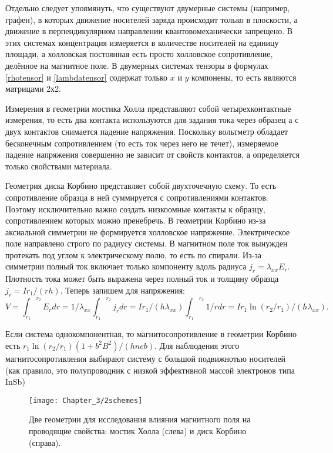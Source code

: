 Отдельно следует упоямянуть, что существуют двумерные системы (например, графен), в которых движение носителей заряда происходит только в плоскости, а движение в перпендикулярном направлении квантовомеханически запрещено. В этих системах концентрация измеряется в количестве носителей на единицу площади, а холловская постоянная есть просто холловское сопротивление, делённое на магнитное поле. В двумерных системах тензоры в формулах \ref{rhotensor} и \ref{lambdatensor} содержат только $x$ и $y$ компонены, то есть являются матрицами 2х2.

Измерения в геометрии мостика Холла представляют собой четырехконтактные измерения, то есть два контакта используются для задания тока через образец а с двух контактов снимается падение напряжения. Поскольку вольтметр обладает бесконечным сопротивлением (то есть ток через него не течет), измеряемое падение напряжения совершенно не зависит от свойств контактов, а определяется только свойствами материала.

Геометрия диска Корбино представляет собой двухточечную схему. То есть сопротивление образца в ней суммируется с сопротивлениями контактов. Поэтому исключительно важно создать низкоомные контакты к образцу, сопротивлением которых можно пренебречь. В геометрии Корбино из-за аксиальной симметрии не формируется холловское напряжение. Электрическое поле направлено строго по радиусу системы. В магнитном поле ток вынужден протекать под углом к электрическому полю, то есть по спирали. Из-за симметрии полный ток включает только компоненту вдоль радиуса $j_r=\lambda_{xx} E_r$. Плотность тока может быть выражена через полный ток и толщину образца $j_r=Ir_1/(rh)$. Теперь запишем для напряжения:
$$V={\int_{r_1}}^{r_2}E_r dr=1/\lambda_{xx}{\int_{r_1}}^{r_2}j_r dr=Ir_1/(h\lambda_{xx}){\int_{r_1}}^{r_2}1/r dr=Ir_1\ln(r_2/r_1)/(h\lambda_{xx}).$$

Если система однокомпонентная, то магнитосопротивление в геометрии Корбино есть $r_1\ln(r_2/r_1)(1+b^2B^2)/(hneb)$. Для наблюдения этого магнитосопротивления выбирают систему с большой подвижнотью носителей (как правило, это полупроводник с низкой эффективной массой электронов типа InSb)

\begin{figure}
	\texttt{[image: Chapter\_3/2schemes]}
	\caption{Две геометрии для исследования влияния магнитного поля на проводящие свойства: мостик Холла (слева) и диск Корбино (справа).}
	\label{fig2}
\end{figure}




